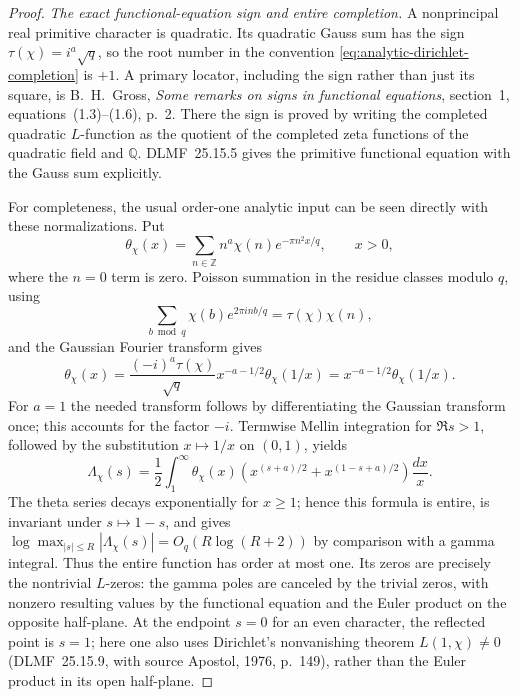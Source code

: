 \begin{proof}
\emph{The exact functional-equation sign and entire completion.}
A nonprincipal real primitive character is quadratic. Its
quadratic Gauss sum has the sign
$\tau(\chi)=i^a\sqrt q$, so the root number in the convention
\eqref{eq:analytic-dirichlet-completion} is $+1$. A primary
locator, including the sign rather than just its square, is
B.~H.~Gross, \emph{Some remarks on signs in functional equations},
section~1, equations~(1.3)--(1.6), p.~2. There the sign is proved
by writing the completed quadratic $L$-function as the quotient
of the completed zeta functions of the quadratic field and
$\mathbb Q$. DLMF~25.15.5 gives the primitive functional equation
with the Gauss sum explicitly.

For completeness, the usual order-one analytic input can be
seen directly with these normalizations. Put
\[
 \theta_\chi(x)=\sum_{n\in\mathbb Z}n^a\chi(n)e^{-\pi n^2x/q},
 \qquad x>0,
\]
where the $n=0$ term is zero. Poisson summation in the residue
classes modulo $q$, using
\[
 \sum_{b\bmod q}\chi(b)e^{2\pi inb/q}=\tau(\chi)\chi(n),
\]
and the Gaussian Fourier transform gives
\[
 \theta_\chi(x)=\frac{(-i)^a\tau(\chi)}{\sqrt q}
        x^{-a-1/2}\theta_\chi(1/x)
              =x^{-a-1/2}\theta_\chi(1/x).
\]
For $a=1$ the needed transform follows by differentiating the
Gaussian transform once; this accounts for the factor $-i$.
Termwise Mellin integration for $\Re s>1$, followed by the
substitution $x\mapsto1/x$ on $(0,1)$, yields
\begin{equation}\label{eq:analytic-dirichlet-theta-entire}
 \Lambda_\chi(s)=\frac12\int_1^\infty\theta_\chi(x)
       \left(x^{(s+a)/2}+x^{(1-s+a)/2}\right)\frac{dx}{x}.
\end{equation}
The theta series decays exponentially for $x\ge1$; hence this
formula is entire, is invariant under $s\mapsto1-s$, and gives
$\log\max_{|s|\le R}|\Lambda_\chi(s)|=O_q(R\log(R+2))$ by
comparison with a gamma integral. Thus the entire function has
order at most one. Its zeros are precisely the nontrivial
$L$-zeros: the gamma poles are canceled by the trivial zeros,
with nonzero resulting values by the functional equation and
the Euler product on the opposite half-plane. At the endpoint
$s=0$ for an even character, the reflected point is $s=1$;
here one also uses Dirichlet's nonvanishing theorem
$L(1,\chi)\ne0$ (DLMF~25.15.9, with source Apostol, 1976,
p.~149), rather than the Euler product in its open half-plane.


\end{proof}
